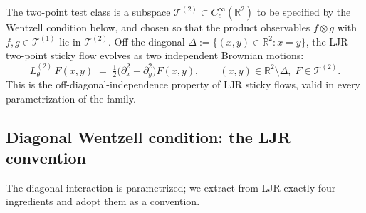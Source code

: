 \documentclass[11pt,reqno]{amsart}
\theoremstyle{plain}
\theoremstyle{definition}
\theoremstyle{remark}
\newcommand{\R}{\mathbb{R}}
\newcommand{\cT}{\mathcal T}
\begin{document}
The two-point test class is a subspace
$\cT^{(2)}\subset C_{c}^{\infty}(\R^{2})$ to be specified by the
Wentzell condition below, and chosen so that the product
observables $f\otimes g$ with $f,g\in\cT^{(1)}$ lie in
$\cT^{(2)}$. Off the diagonal $\Delta:=\{(x,y)\in\R^{2}:x=y\}$,
the LJR two-point sticky flow evolves as two independent
Brownian motions:
\begin{equation}\label{eq:L2-offdiag}
  L^{(2)}_{\theta}\,F(x,y)\;=\;\tfrac{1}{2}\bigl(\partial_{x}^{2}+\partial_{y}^{2}\bigr)F(x,y),
  \qquad (x,y)\in\R^{2}\setminus\Delta,\;F\in\cT^{(2)}.
\end{equation}
This is the off-diagonal-independence property of LJR sticky
flows, valid in every parametrization of the family.

\subsection{Diagonal Wentzell condition: the LJR convention}\label{sec:LJR-diag}

The diagonal interaction is parametrized; we extract from LJR
exactly four ingredients and adopt them as a convention.
\end{document}
